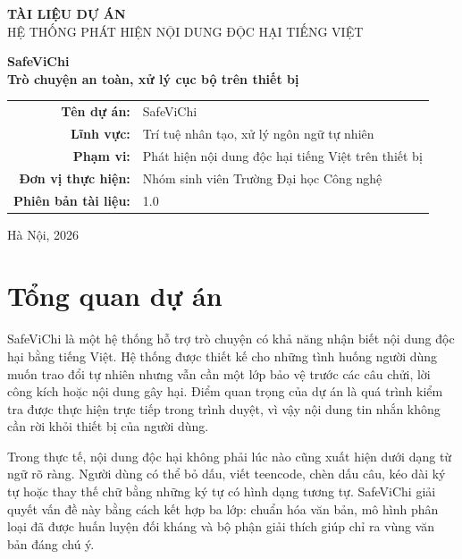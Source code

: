 \documentclass[12pt,a4paper]{article}
\begin{document}
\begin{titlepage}
    \centering
    \vspace*{18mm}
    {\Large \textbf{TÀI LIỆU DỰ ÁN}}\\[10mm]
    {\large HỆ THỐNG PHÁT HIỆN NỘI DUNG ĐỘC HẠI TIẾNG VIỆT}\\[25mm]

    {\Huge\bfseries\color{safegreen}
    SafeViChi\\[5mm]
    \large Trò chuyện an toàn, xử lý cục bộ trên thiết bị\par}

    \vspace{22mm}
    \begin{tabular}{rl}
        \textbf{Tên dự án:} & SafeViChi\\[2mm]
        \textbf{Lĩnh vực:} & Trí tuệ nhân tạo, xử lý ngôn ngữ tự nhiên\\[2mm]
        \textbf{Phạm vi:} & Phát hiện nội dung độc hại tiếng Việt trên thiết bị\\[2mm]
        \textbf{Đơn vị thực hiện:} & Nhóm sinh viên Trường Đại học Công nghệ\\[2mm]
        \textbf{Phiên bản tài liệu:} & 1.0
    \end{tabular}

    \vfill
    {\large Hà Nội, 2026}
\end{titlepage}

\tableofcontents
\newpage
{}

\section{Tổng quan dự án}

SafeViChi là một hệ thống hỗ trợ trò chuyện có khả năng nhận biết nội dung độc hại bằng tiếng Việt. Hệ thống được thiết kế cho những tình huống người dùng muốn trao đổi tự nhiên nhưng vẫn cần một lớp bảo vệ trước các câu chửi, lời công kích hoặc nội dung gây hại. Điểm quan trọng của dự án là quá trình kiểm tra được thực hiện trực tiếp trong trình duyệt, vì vậy nội dung tin nhắn không cần rời khỏi thiết bị của người dùng.

Trong thực tế, nội dung độc hại không phải lúc nào cũng xuất hiện dưới dạng từ ngữ rõ ràng. Người dùng có thể bỏ dấu, viết teencode, chèn dấu câu, kéo dài ký tự hoặc thay thế chữ bằng những ký tự có hình dạng tương tự. SafeViChi giải quyết vấn đề này bằng cách kết hợp ba lớp: chuẩn hóa văn bản, mô hình phân loại đã được huấn luyện đối kháng và bộ phận giải thích giúp chỉ ra vùng văn bản đáng chú ý.
\end{document}
